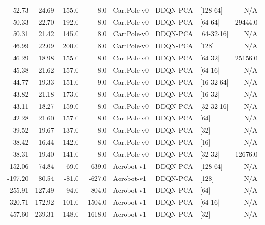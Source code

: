 \begin{tabular}{rrrrlllr}
  52.73 &   24.69 &  155.0 &     8.0 &     CartPole-v0 &  DDQN-PCA &         [128-64] &             N/A \\
  50.33 &   22.70 &  192.0 &     8.0 &     CartPole-v0 &  DDQN-PCA &          [64-64] &         29444.0 \\
  50.31 &   21.42 &  145.0 &     8.0 &     CartPole-v0 &  DDQN-PCA &       [64-32-16] &             N/A \\
  46.99 &   22.09 &  200.0 &     8.0 &     CartPole-v0 &  DDQN-PCA &            [128] &             N/A \\
  46.29 &   18.98 &  155.0 &     8.0 &     CartPole-v0 &  DDQN-PCA &          [64-32] &         25156.0 \\
  45.38 &   21.62 &  157.0 &     8.0 &     CartPole-v0 &  DDQN-PCA &          [64-16] &             N/A \\
  44.77 &   19.33 &  151.0 &     9.0 &     CartPole-v0 &  DDQN-PCA &       [16-32-64] &             N/A \\
  43.82 &   21.18 &  173.0 &     8.0 &     CartPole-v0 &  DDQN-PCA &          [16-32] &             N/A \\
  43.11 &   18.27 &  159.0 &     8.0 &     CartPole-v0 &  DDQN-PCA &       [32-32-16] &             N/A \\
  42.28 &   21.60 &  157.0 &     8.0 &     CartPole-v0 &  DDQN-PCA &             [64] &             N/A \\
  39.52 &   19.67 &  137.0 &     8.0 &     CartPole-v0 &  DDQN-PCA &             [32] &             N/A \\
  38.42 &   16.44 &  142.0 &     8.0 &     CartPole-v0 &  DDQN-PCA &             [16] &             N/A \\
  38.31 &   19.40 &  141.0 &     8.0 &     CartPole-v0 &  DDQN-PCA &          [32-32] &         12676.0 \\
-152.06 &   74.84 &  -69.0 &  -639.0 &      Acrobot-v1 &  DDQN-PCA &         [128-64] &             N/A \\
-197.20 &   80.54 &  -81.0 &  -627.0 &      Acrobot-v1 &  DDQN-PCA &            [128] &             N/A \\
-255.91 &  127.49 &  -94.0 &  -804.0 &      Acrobot-v1 &  DDQN-PCA &             [64] &             N/A \\
-320.71 &  172.92 & -101.0 & -1504.0 &      Acrobot-v1 &  DDQN-PCA &          [64-16] &             N/A \\
-457.60 &  239.31 & -148.0 & -1618.0 &      Acrobot-v1 &  DDQN-PCA &             [32] &             N/A \\

\end{tabular}
